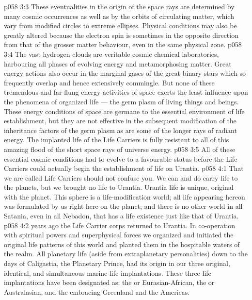 \vs p058 3:3 These eventualities in the origin of the space rays are determined by many cosmic occurrences as well as by the orbits of circulating matter, which vary from modified circles to extreme ellipses. Physical conditions may also be greatly altered because the electron spin is sometimes in the opposite direction from that of the grosser matter behaviour, even in the same physical zone.
\vs p058 3:4 The vast hydrogen clouds are veritable cosmic chemical laboratories, harbouring all phases of evolving energy and metamorphosing matter. Great energy actions also occur in the marginal gases of the great binary stars which so frequently overlap and hence extensively commingle. But none of these tremendous and far\hyp{}flung energy activities of space exerts the least influence upon the phenomena of organized life --- the germ plasm of living things and beings. These energy conditions of space are germane to the essential environment of life establishment, but they are not effective in the subsequent modification of the inheritance factors of the germ plasm as are some of the longer rays of radiant energy. The implanted life of the Life Carriers is fully resistant to all of this amazing flood of the short space rays of universe energy.
\vs p058 3:5 \pc All of these essential cosmic conditions had to evolve to a favourable status before the Life Carriers could actually begin the establishment of life on Urantia.
\vs p058 4:1 That we are called Life Carriers should not confuse you. We can and do carry life to the planets, but we brought no life to Urantia. Urantia life is unique, original with the planet. This sphere is a life\hyp{}modification world; all life appearing hereon was formulated by us right here on the planet; and there is no other world in all Satania, even in all Nebadon, that has a life existence just like that of Urantia.
\vs p058 4:2 \pc {} years ago the Life Carrier corps returned to Urantia. In co\hyp{}operation with spiritual powers and superphysical forces we organized and initiated the original life patterns of this world and planted them in the hospitable waters of the realm. All planetary life (aside from extraplanetary personalities) down to the days of Caligastia, the Planetary Prince, had its origin in our three original, identical, and simultaneous marine\hyp{}life implantations. These three life implantations have been designated as: the  or Eurasian\hyp{}African, the  or Australasian, and the  embracing Greenland and the Americas.
